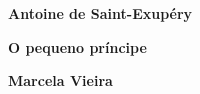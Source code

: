 \textbf{Antoine de Saint-Exupéry} \lipsum[1]

\textbf{O pequeno príncipe} \lipsum[1]

\textbf{Marcela Vieira} \lipsum[1]


